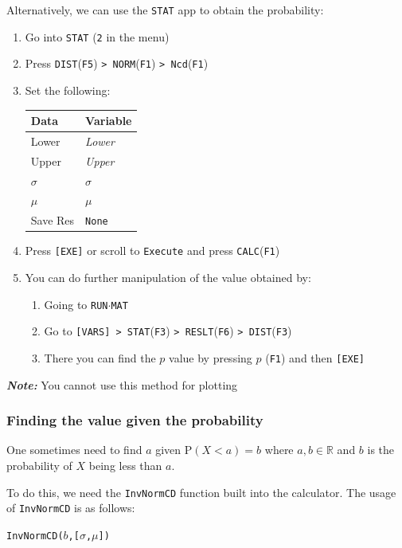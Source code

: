\documentclass[a5paper]{memoir}
\def\code#1{\texttt{#1}}
\def\note#1{\textcolor[HTML]{109fa9}{\textbf{\textit{Note:}}} #1}
\def\runmat{\code{RUN$\cdot$MAT} }
\def\Fone{(\code{F1}) }
\def\Fthree{(\code{F3}) }
\def\Ffive{(\code{F5}) }
\def\Fsix{(\code{F6}) }
\def\fone{(\code{F1})}
\newcommand{\addtoindex}[1]{#1\index{#1}}
\begin{document}
Alternatively, we can use the \code{STAT} app to obtain the probability:
\begin{enumerate}
	\item Go into \code{STAT} (\code{2} in the menu)
	\item Press \code{DIST}\Ffive\code{> NORM}\Fone\code{> Ncd}\fone
	\item Set the following:
	\begin{center}
		\setlength{\tabcolsep}{10pt}
		\renewcommand{\arraystretch}{1.2}
		\begin{tabular}{|l|l|}
			\hline
			Data		& Variable \\
			\hline
			Lower		& \textit{Lower} \\
			\hline
			Upper		& \textit{Upper} \\
			\hline
			$\sigma$	& $\sigma$ \\
			\hline
			$\mu$		& $\mu$ \\
			\hline
			Save Res	& \code{None} \\
			\hline
		\end{tabular}
	\end{center}
	\item Press \code{[EXE]} or scroll to \code{Execute} and press \code{CALC}\Fone
	\item You can do further manipulation of the value obtained by:
	\begin{enumerate}
		\item Going to \runmat
		\item Go to \code{[VARS] > STAT}\Fthree \code{> RESLT}\Fsix\code{> DIST}\Fthree
		\item There you can find the $p$ value by pressing $p$ \Fone and then \code{[EXE]}
	\end{enumerate} 
\end{enumerate}
\note{You cannot use this method for plotting}

\subsubsection{Finding the value given the probability}
One sometimes need to find $a$ given $\textrm{P}(X < a) = b$ where $a,b \in \mathbb{R}$ and $b$ is the probability of $X$ being less than $a$. 

To do this, we need the \code{\addtoindex{InvNormCD}} function built into the calculator. The usage of \code{InvNormCD} is as follows:
\begin{center}
	\code{InvNormCD($b$,[$\sigma$,$\mu$])}
\end{center}
\end{document}
